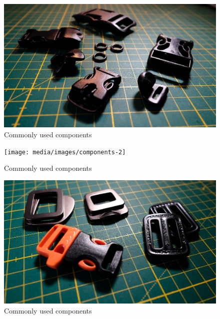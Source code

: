 \begin{figure}[H]
  \includegraphics[width=\textwidth]{media/images/components-1}
  \caption{Commonly used components}
  \label{img:components-1}
\end{figure}

\begin{figure}[H]
  \texttt{[image: media/images/components-2]}
  \caption{Commonly used components}
  \label{img:components-2}
\end{figure}

\begin{figure}[H]
  \includegraphics[width=\textwidth]{media/images/components-3}
  \caption{Commonly used components}
  \label{img:components-3}
\end{figure}
